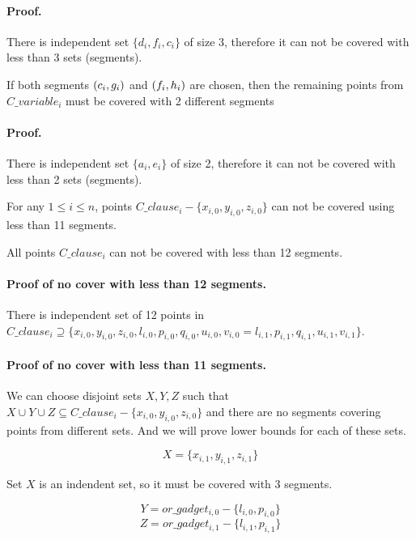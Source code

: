 \paragraph{Proof.}
There is independent set $\{d_i, f_i, c_i\}$ of size 3, therefore it can
not be covered with less than 3 sets (segments).


\begin{lemma}
\label{choose_variables_both}
If both segments $(c_i, g_i)$ and $(f_i, h_i)$ are chosen, then
the remaining points from $C\_variable_i$ must be covered with 2 different
segments
\end{lemma}
\paragraph{Proof.}
There is independent set $\{a_i, e_i\}$ of size 2, therefore it can
not be covered with less than 2 sets (segments).


\begin{lemma}
\label{cover_clauses_segments_no_less}
For any $1 \le i \le n$,
points $C\_clause_i - \{ x_{i, 0}, y_{i, 0}, z_{i, 0}\}$
can not be covered using less than 11 segments.

All points $C\_clause_i$ can not be covered with less than 12 segments.
\end{lemma}


\paragraph{Proof of no cover with less than 12 segments.}
There is independent set of 12 points in $C\_clause_i \supseteq
\{ x_{i, 0}, y_{i, 0}, z_{i, 0}, l_{i, 0}, p_{i, 0}, q_{i, 0},
u_{i, 0}, v_{i, 0} = l_{i, 1}, p_{i, 1}, q_{i, 1}, u_{i, 1}, v_{i, 1} \}$.

\paragraph{Proof of no cover with less than 11 segments.}

We can choose disjoint sets $X, Y, Z$ such that
$X \cup Y \cup Z \subseteq C\_clause_i - \{x_{i, 0}, y_{i, 0}, z_{i, 0}\}$
and there are no segments covering points from different sets.
And we will prove lower bounds for each of these sets.

$$X = \{x_{i, 1}, y_{i, 1}, z_{i, 1}\}$$

Set $X$ is an indendent set, so it must be covered with 3 segments.

$$Y = or\_gadget_{i, 0} - \{l_{i, 0}, p_{i, 0}\}$$
$$Z = or\_gadget_{i, 1} - \{l_{i, 1}, p_{i, 1}\}$$


